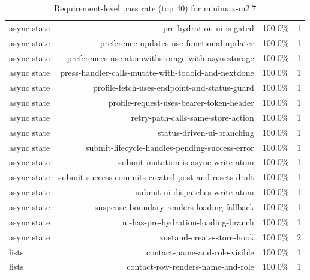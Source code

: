 \begin{table}[htbp]
\begin{tabular}{lrrr}
async state & pre-hydration-ui-is-gated & 100.0\% & 1 \\
async state & preference-updates-use-functional-updater & 100.0\% & 1 \\
async state & preferences-use-atomwithstorage-with-asyncstorage & 100.0\% & 1 \\
async state & press-handler-calls-mutate-with-todoid-and-nextdone & 100.0\% & 1 \\
async state & profile-fetch-uses-endpoint-and-status-guard & 100.0\% & 1 \\
async state & profile-request-uses-bearer-token-header & 100.0\% & 1 \\
async state & retry-path-calls-same-store-action & 100.0\% & 1 \\
async state & status-driven-ui-branching & 100.0\% & 1 \\
async state & submit-lifecycle-handles-pending-success-error & 100.0\% & 1 \\
async state & submit-mutation-is-async-write-atom & 100.0\% & 1 \\
async state & submit-success-commits-created-post-and-resets-draft & 100.0\% & 1 \\
async state & submit-ui-dispatches-write-atom & 100.0\% & 1 \\
async state & suspense-boundary-renders-loading-fallback & 100.0\% & 1 \\
async state & ui-has-pre-hydration-loading-branch & 100.0\% & 1 \\
async state & zustand-create-store-hook & 100.0\% & 2 \\
lists & contact-name-and-role-visible & 100.0\% & 1 \\
lists & contact-row-renders-name-and-role & 100.0\% & 1 \\
\bottomrule
\end{tabular}
\caption{Requirement-level pass rate (top 40) for minimax-m2.7}
\end{table}
